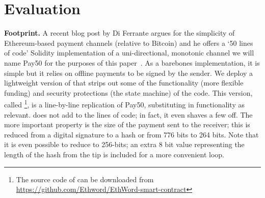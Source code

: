 
\section{Evaluation}


\textbf{Footprint.} A recent blog post by Di Ferrante argues for the simplicity of Ethereum-based payment channels (relative to Bitcoin) and he offers a `50 lines of code' Solidity implementation of a uni-directional, monotonic channel we will name \textsf{Pay50} for the purposes of this paper~\cite{DF17}. As a barebones implementation, it is simple but it relies on offline payments to be signed by the sender. We deploy a lightweight version of \ew that strips out some of the functionality (\eg more flexible funding) and security protections (\eg the state machine) of the code.%
 This version, called \eww \footnote{The source code of \eww can be downloaded from \url{https://github.com/Ethword/EthWord-smart-contract}}, is a line-by-line replication of \textsf{Pay50}, substituting in \ew functionality as relevant. %
 \eww does not add to the lines of code; in fact, it even shaves a few off. The more important property is the size of the payment sent to the receiver; this is reduced from a digital signature to a hash or from 776 bits to 264 bits. Note that it is even possible to reduce \eww to 256-bits; an extra 8 bit value representing the length of the hash from the tip is included for a more convenient loop.


